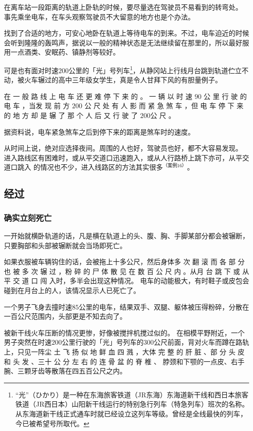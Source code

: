 \documentclass[UTF8]{ctexart}
\begin{document}
在离车站一段距离的轨道上卧轨的时候，要尽量选在驾驶员不易看到的转弯处。
事先乘坐电车，在车头观察驾驶员不大留意的地方也是个办法。

找到了合适的地方，可安心地卧在轨道上等待电车的到来。不过，电车迫近的时候会听到隆隆的轰鸣声，据说以一般的精神状态是无法继续留在那里的，所以最好服用一点酒类、安眠药、镇静剂等较好。

可是也有面对时速$200$公里的「光」号列车\footnote{“光”（ひかり）是一种在东海旅客铁道（JR东海）东海道新干线和西日本旅客铁道（JR西日本）山阳新干线运行的特别急行列车（特急列车）班次的名称。从东海道新干线正式通车时就已经设立这列车等级。曾经是全线最快的列车，今已被希望号所取代。}，从静冈站上行线月台跳到轨道伫立不动，被火车辗过的高中三年级女学生，真是令人甘拜下风的有胆量例子。

在 一 般 路 线 上 电 车 还 更 难 停 下 来 的 。
一 辆 以 时 速 $90$ 公 里 行 驶 的 电 车 ，当发 现 前 方 $200$ 公 尺 处 有 人 影 而 紧 急 煞 车 ，但 电 车 停 下 来 的 地 方 却 是 辗 了 那 个 人 后 又 行 驶 了 $200$公 尺 。

据资料说，电车紧急煞车之后到停下来的距离是煞车时的速度。

从时间上说，绝对应选择夜间。周围的人也好，驾驶员也好，都不大容易发现。 
进入路线区有困难时，或从平交道口迅速跑入，或从人行路桥上跳下亦可，从平交道口跳入 的情况也不少，进入线路区的方法其实很多$^{（案例 16）}$。

\subsection{经过}

\subsubsection*{确实立刻死亡}

一开始就横卧轨道的话，凡是横在轨道上的头、腹、胸、手脚某部分都会被辗断，只要胸部和头部被辗断就会当场即死亡。

如果衣服被车辆钩住的话，会被拖上十多公尺，然后身体多 次 翻 滚 而 各 部 分 也 被 多 次 辗 过 ，粉 碎 的 尸 体 散 见 在 数 百 公 尺 内 。从月 台 跳 下 或 从 平 交 道 口 闯 入时，多半会出现这种情况。 电车的动能极大，有时鞋子或皮包会碰到在月台上的人，该情况显示人已死亡了。

一个男子飞身去撞时速$85$公里的电车，结果双手、双腿、躯体被压得粉碎，分散在一百公尺范围内，头部更是不知去向了。

被新干线火车压断的情况更惨，好像被搅拌机搅过似的。
在相模平野附近，一个男子突然在时速$200$公里行驶的「光」号列车的$300$公尺前面，背对火车而蹲在路轨上，只见一阵尘 土 飞 扬 似 地 鲜 血 四 溅 ，大体 完 整 的 肝 脏 、部 分 头 皮 和 头 发 、三十 公 分 左 右 的 连 骨 盆 的 脊 椎 、 脖颈和下颚的一点皮、右手腕、三颗牙齿等散落在四五百公尺之内。
\end{document}

